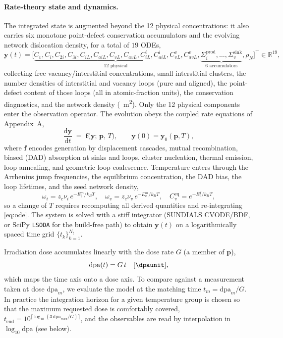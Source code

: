 \documentclass{article}
\newcommand{\R}{\mathbb{R}}
\newcommand{\param}{\bm{p}}
\newcommand{\dpa}{\mathrm{dpa}}
\begin{document}
\paragraph{Rate-theory state and dynamics.}
The integrated state is augmented beyond the 12 physical concentrations: it also
carries six monotone point-defect conservation accumulators and the evolving
network dislocation density, for a total of $19$ ODEs,
\begin{equation}
  \bm{y}(t)=\big[\underbrace{C_v,C_i,C_{2i},C_{3i},
  C_{iL},C_{aiL},C_{vL},C_{avL},
  C_{iL}^{i},C_{aiL}^{i},C_{vL}^{v},C_{avL}^{v}}_{\text{12 physical}},
  \underbrace{\Sigma^{\mathrm{prod}}_i,\dots,\Sigma^{\mathrm{sink}}_v}_{\text{6 accumulators}},
  \rho_N\big]^{\!\top}\in\R^{19},
\end{equation}
collecting free vacancy/interstitial concentrations, small interstitial clusters,
the number densities of interstitial and vacancy loops (pure and aligned),
the point-defect content of those loops (all in atomic-fraction units), the
conservation diagnostics, and the network density (\si{\per\square\metre}). Only
the 12 physical components enter the observation operator. The evolution obeys
the coupled rate equations of Appendix~A,
\begin{equation}
  \frac{\mathrm{d}\bm{y}}{\mathrm{d}t}
  \;=\;\bm{f}\!\big(\bm{y};\,\param,\,T\big),
  \qquad \bm{y}(0)=\bm{y}_0(\param,T),
  \label{eq:ode}
\end{equation}
where $\bm{f}$ encodes generation by displacement cascades, mutual recombination,
biased (DAD) absorption at sinks and loops, cluster nucleation, thermal emission,
loop annealing, and geometric loop coalescence. Temperature enters through the
Arrhenius jump frequencies, the equilibrium concentration, the DAD bias, the loop
lifetimes, and the seed network density,
\begin{equation}
  \omega_{i}=z_c\nu_i\,e^{-E^m_i/k_BT},\quad
  \omega_{v}=z_c\nu_v\,e^{-E^m_v/k_BT},\quad
  C_v^{\mathrm{eq}}=e^{-E^f_v/k_BT},
  \label{eq:arrhenius}
\end{equation}
so a change of $T$ requires recomputing all derived quantities and re-integrating
\eqref{eq:ode}. The system is solved with a stiff integrator (SUNDIALS CVODE/BDF,
or SciPy \texttt{LSODA} for the build-free path) to obtain $\bm{y}(t)$ on a
logarithmically spaced time grid $\{t_k\}_{k=1}^{N_t}$.

Irradiation dose accumulates linearly with the dose rate $G$ (a member of $\param$),
\begin{equation}
  \dpa(t)=G\,t \quad[\si{\dpaunit}],
  \label{eq:dose}
\end{equation}
which maps the time axis onto a dose axis. To compare against a measurement taken
at dose $\dpa_m$, we evaluate the model at the matching time $t_m=\dpa_m/G$. In
practice the integration horizon for a given temperature group is chosen so that
the maximum requested dose is comfortably covered,
\(t_{\mathrm{end}}=10^{\lceil \log_{10}(3\,\dpa_{\max}/G)\rceil}\), and the
observables are read by interpolation in $\log_{10}\dpa$ (see below).
\end{document}
